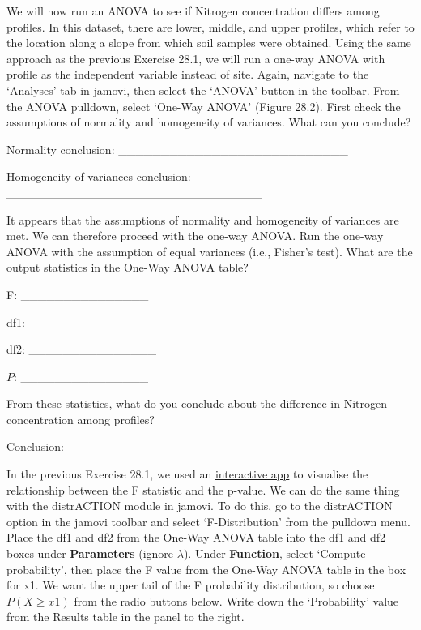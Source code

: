 \documentclass[
]{scrbook}
\begin{document}
We will now run an ANOVA to see if Nitrogen concentration differs among profiles.
In this dataset, there are lower, middle, and upper profiles, which refer to the location along a slope from which soil samples were obtained.
Using the same approach as the previous Exercise 28.1, we will run a one-way ANOVA with profile as the independent variable instead of site.
Again, navigate to the `Analyses' tab in jamovi, then select the `ANOVA' button in the toolbar.
From the ANOVA pulldown, select `One-Way ANOVA' (Figure 28.2).
First check the assumptions of normality and homogeneity of variances.
What can you conclude?

Normality conclusion: \_\_\_\_\_\_\_\_\_\_\_\_\_\_\_\_\_\_\_\_\_\_\_\_\_\_\_

Homogeneity of variances conclusion: \_\_\_\_\_\_\_\_\_\_\_\_\_\_\_\_\_\_\_\_\_\_\_\_\_\_\_\_\_\_

It appears that the assumptions of normality and homogeneity of variances are met.
We can therefore proceed with the one-way ANOVA.
Run the one-way ANOVA with the assumption of equal variances (i.e., Fisher's test).
What are the output statistics in the One-Way ANOVA table?

F: \_\_\_\_\_\_\_\_\_\_\_\_\_\_\_

df1: \_\_\_\_\_\_\_\_\_\_\_\_\_\_\_

df2: \_\_\_\_\_\_\_\_\_\_\_\_\_\_\_

\(P\): \_\_\_\_\_\_\_\_\_\_\_\_\_\_\_

From these statistics, what do you conclude about the difference in Nitrogen concentration among profiles?

Conclusion: \_\_\_\_\_\_\_\_\_\_\_\_\_\_\_\_\_\_\_\_\_

In the previous Exercise 28.1, we used an \href{https://bradduthie.shinyapps.io/f_distribution/}{interactive app} to visualise the relationship between the F statistic and the p-value.
We can do the same thing with the distrACTION module in jamovi.
To do this, go to the distrACTION option in the jamovi toolbar and select `F-Distribution' from the pulldown menu.
Place the df1 and df2 from the One-Way ANOVA table into the df1 and df2 boxes under \textbf{Parameters} (ignore \(\lambda\)).
Under \textbf{Function}, select `Compute probability', then place the F value from the One-Way ANOVA table in the box for x1.
We want the upper tail of the F probability distribution, so choose \(P(X \geq x1)\) from the radio buttons below.
Write down the `Probability' value from the Results table in the panel to the right.
\end{document}
